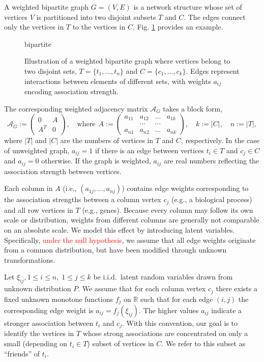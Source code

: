 \documentclass{llncs}
\newcommand{\red}[1]{\textcolor{red}{#1}}
\begin{document}
A weighted bipartite graph $G = (V, E)$ is a network structure whose set of vertices $V$ is partitioned into two disjoint subsets $T$ and $C$. The edges connect only the vertices in $T$ to the vertices in $C$.
Fig. \ref{fig:nice_name} provides an example. 
\begin{figure}
 \centering
 {bipartite}
 \caption{Illustration of a weighted bipartite graph where vertices belong to two disjoint sets, $T = \{t_1, \dots, t_n\}$ and $C = \{c_1, \dots, c_k\} $.
Edges represent interactions between elements of different sets, with weights $a_{ij}$ encoding association strength.}
 \label{fig:nice_name}
\end{figure}
The corresponding weighted adjacency matrix $\mathcal{A}_G$ takes a block form,
\begin{equation}
\label{eq:adj_matrix}
\mathcal{A}_G := \begin{pmatrix}
0 & A\\
A^{T} & 0
\end{pmatrix},
\quad \text{where}~~
A := \begin{pmatrix}
a_{11} & a_{12} & \dots & a_{1k} \\
 &\cdots & \cdots & \\
a_{n1} & a_{n2} & \dots & a_{nk}
\end{pmatrix},
\quad k := |C|, \quad
n := |T|,
\end{equation}
where $|T|$ and $|C|$ are the numbers of vertices in $T$ and $C$, respectively. In the case of unweighted graph, $a_{ij} = 1$ if there is an edge between vertices $t_i\in T$ and $c_{j}\in C$ and $a_{ij} = 0$ otherwise. If the graph is weighted, $a_{ij}$ are real numbers reflecting the association strength between vertices. 

Each column in $A$ (i.e., $(a_{1j}, \dots, a_{nj})$) contains edge weights corresponding to the association strengths between a column vertex $c_j$ (e.g., a biological process) and all row vertices in $T$ (e.g., genes). Because every column may follow its own scale or distribution, weights from different columns are generally not comparable on an absolute scale. We model this effect by introducing latent variables. Specifically, \red{under the null hypothesis}, we assume that all edge weights originate from a common distribution, but have been modified through unknown transformations. 

Let $\xi_{ij}, 1 \le i \le n,\; 1 \le j \le k$ be i.i.d.\ latent random variables drawn from unknown distribution $P$. We assume that for each column vertex $c_j$ there exists a fixed unknown monotone functions $f_j$ on $\mathbb{R}$
such that for each edge $(i,j)$ the corresponding edge weight is $a_{ij} = f_j(\xi_{ij})$. The higher values $a_{ij}$ indicate a stronger association between $t_i$ and $c_j$. With this convention, our goal is to identify the vertices in $T$ whose strong associations are concentrated on only a small (depending on $t_i\in T$) subset of vertices in $C$. We refer to this subset as ``friends'' of $t_i$.
\end{document}
